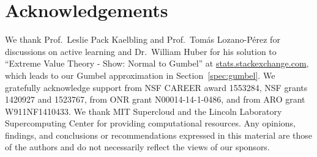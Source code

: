 \documentclass{article}
\begin{document}
%

%
%
%
%
%

\printAffiliationsAndNotice{}  %
%
%

\begin{abstract} 

\end{abstract} 















\section*{Acknowledgements}
%
%
We thank Prof.\ Leslie Pack Kaelbling and Prof.\ Tom\'as Lozano-P\'erez for discussions on active learning and Dr.\ William Huber for his solution to ``Extreme Value Theory - Show: Normal to Gumbel'' at \url{stats.stackexchange.com}, which leads to our Gumbel approximation in Section~\ref{spec:gumbel}. We gratefully acknowledge support from NSF CAREER award 1553284, NSF grants 1420927 and 1523767, from ONR grant N00014-14-1-0486, and from ARO grant W911NF1410433.  We thank MIT Supercloud and the Lincoln Laboratory Supercomputing Center for providing computational resources. Any opinions, findings, and conclusions or recommendations expressed in this material are those of the authors and do not necessarily reflect the views of our sponsors.

\begin{small}


\end{small}

\appendix





\end{document}
